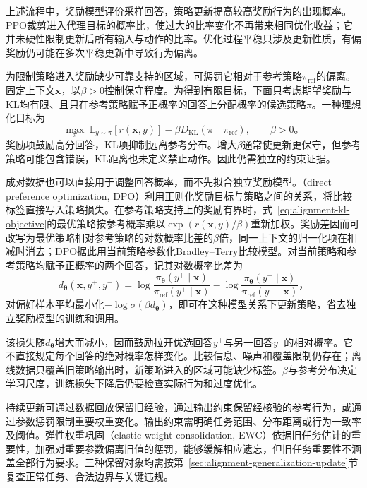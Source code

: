上述流程中，奖励模型评价采样回答，策略更新提高较高奖励行为的出现概率。PPO裁剪进入代理目标的概率比，使过大的比率变化不再带来相同优化收益；它并未硬性限制更新后所有输入与动作的比率。优化过程平稳只涉及更新性质，有偏奖励仍可能在多次平稳更新中导致行为偏离。

为限制策略进入奖励缺少可靠支持的区域，可惩罚它相对于参考策略$\pi_{\mathrm{ref}}$的偏离。固定上下文$\bm{x}$，以$\beta>0$控制保守程度。为得到有限目标，下面只考虑期望奖励与KL均有限、且只在参考策略赋予正概率的回答上分配概率的候选策略$\pi$。一种理想化目标为
\begin{equation}
 \max_\pi\
 \mathbb E_{y\sim\pi}[r(\bm{x},y)]
 -\beta D_{\mathrm{KL}}(\pi\|\pi_{\mathrm{ref}}),
 \qquad \beta>0\text{。}
 \label{eq:alignment-kl-objective}
\end{equation}
奖励项鼓励高分回答，KL项抑制远离参考分布。增大$\beta$通常使更新更保守，但参考策略可能包含错误，KL距离也未定义禁止动作。因此仍需独立的约束证据。

成对数据也可以直接用于调整回答概率，而不先拟合独立奖励模型。（direct preference optimization, DPO）利用正则化奖励目标与策略之间的关系，将比较标签直接写入策略损失。在参考策略支持上的奖励有界时，式~\eqref{eq:alignment-kl-objective}的最优策略按参考概率乘以$\exp(r(\bm{x},y)/\beta)$重新加权。奖励差因而可改写为最优策略相对参考策略的对数概率比差的$\beta$倍，同一上下文的归一化项在相减时消去；DPO据此用当前策略参数化Bradley--Terry比较模型。对当前策略和参考策略均赋予正概率的两个回答，记其对数概率比差为
\[
 d_{\bm{\theta}}(\bm{x},y^+,y^-)
 =\log\frac{\pi_{\bm{\theta}}(y^+\mid\bm{x})}
              {\pi_{\mathrm{ref}}(y^+\mid\bm{x})}
 -\log\frac{\pi_{\bm{\theta}}(y^-\mid\bm{x})}
              {\pi_{\mathrm{ref}}(y^-\mid\bm{x})}\text{，}
\]
对偏好样本平均最小化$-\log\sigma(\beta d_{\bm\theta})$，即可在这种模型关系下更新策略，省去独立奖励模型的训练和调用。

该损失随$d_{\bm\theta}$增大而减小，因而鼓励拉开优选回答$y^+$与另一回答$y^-$的相对概率。它不直接规定每个回答的绝对概率怎样变化。比较信息、噪声和覆盖限制仍存在；离线数据只覆盖旧策略输出时，新策略进入的区域可能缺少标签。$\beta$与参考分布决定学习尺度，训练损失下降后仍要检查实际行为和过度优化。

持续更新可通过数据回放保留旧经验，通过输出约束保留经核验的参考行为，或通过参数惩罚限制重要权重变化。输出约束需明确任务范围、分布距离或行为一致率及阈值。弹性权重巩固（elastic weight consolidation, EWC）依据旧任务估计的重要性，加强对重要参数偏离旧值的惩罚，能够缓解相应遗忘，但旧任务重要性不涵盖全部行为要求。三种保留对象均需按第~\ref{sec:alignment-generalization-update}节复查正常任务、合法边界与关键违规。

